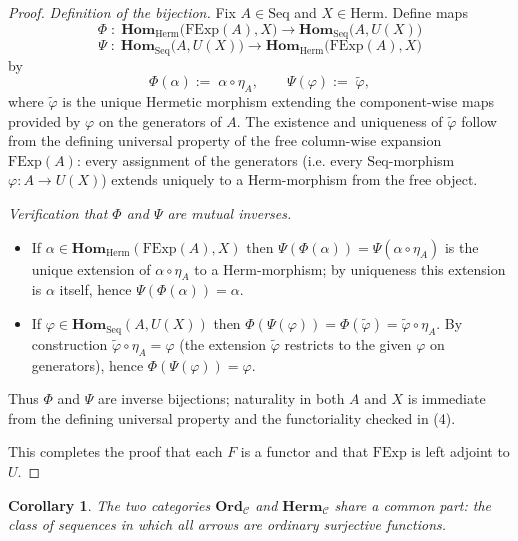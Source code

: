 \documentclass[11pt]{book}
\theoremstyle{definition}
\theoremstyle{plain}
\newtheorem{corollary}[theorem]{Corollary}
\theoremstyle{remark}
\begin{document}
\begin{proof}
\medskip\noindent\emph{Definition of the bijection.} Fix \(A\in\mathrm{Seq}\) and
\(X\in\mathrm{Herm}\). Define maps
\[
    \Phi\;:\;\mathbf{Hom}_{\mathrm{Herm}}\big(\mathrm{FExp}(A),X\big)\longrightarrow
    \mathbf{Hom}_{\mathrm{Seq}}\big(A,U(X)\big)\]
\[
    \Psi\;:\;\mathbf{Hom}_{\mathrm{Seq}}\big(A,U(X)\big)\longrightarrow
    \mathbf{Hom}_{\mathrm{Herm}}\big(\mathrm{FExp}(A),X\big)
\]
by
\[
    \Phi(\alpha):=\; \alpha\circ\eta_A,
    \qquad
    \Psi(\varphi):=\; \tilde\varphi,
\]
where \(\tilde\varphi\) is the unique Hermetic morphism extending the
component-wise maps provided by \(\varphi\) on the generators of \(A\).  The
existence and uniqueness of \(\tilde\varphi\) follow from the defining
universal property of the free column-wise expansion \(\mathrm{FExp}(A)\):
every assignment of the generators (i.e. every \(\mathrm{Seq}\)-morphism
\(\varphi\colon A\to U(X)\)) extends uniquely to a Herm-morphism from the
free object.

\medskip\noindent\emph{Verification that \(\Phi\) and \(\Psi\) are mutual inverses.}
\begin{itemize}
  \item If \(\alpha\in\mathbf{Hom}_{\mathrm{Herm}}(\mathrm{FExp}(A),X)\) then
    \(\Psi(\Phi(\alpha))=\Psi(\alpha\circ\eta_A)\) is the unique extension of
    \(\alpha\circ\eta_A\) to a Herm-morphism; by uniqueness this extension is
    \(\alpha\) itself, hence \(\Psi(\Phi(\alpha))=\alpha\).
  \item If \(\varphi\in\mathbf{Hom}_{\mathrm{Seq}}(A,U(X))\) then \(\Phi(\Psi(\varphi))=
    \Phi(\tilde\varphi)=\tilde\varphi\circ\eta_A\). By construction
    \(\tilde\varphi\circ\eta_A=\varphi\) (the extension \(\tilde\varphi\)
    restricts to the given \(\varphi\) on generators), hence
    \(\Phi(\Psi(\varphi))=\varphi\).
\end{itemize}
Thus \(\Phi\) and \(\Psi\) are inverse bijections; naturality in both \(A\)
and \(X\) is immediate from the defining universal property and the
functoriality checked in (4).

\medskip\noindent This completes the proof that each \(F\) is a functor and
that \(\mathrm{FExp}\) is left adjoint to \(U\).
\end{proof}

\begin{corollary}
The two categories $\mathbf{Ord}_\mathcal C$ and $\mathbf{Herm}_\mathcal C$ share a common part: 
the class of sequences in which all arrows are ordinary surjective functions.
\end{corollary}
\end{document}
